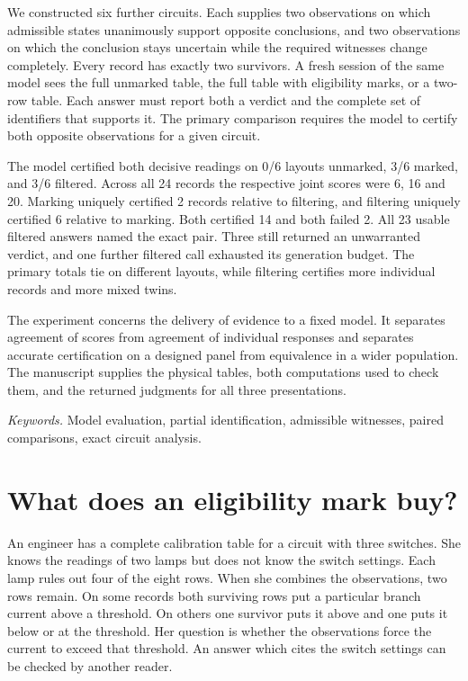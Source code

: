 \documentclass[12pt,letterpaper]{article}
\begin{document}
We constructed six further circuits. Each supplies two observations on which admissible states unanimously support opposite conclusions, and two observations on which the conclusion stays uncertain while the required witnesses change completely. Every record has exactly two survivors. A fresh session of the same model sees the full unmarked table, the full table with eligibility marks, or a two-row table. Each answer must report both a verdict and the complete set of identifiers that supports it. The primary comparison requires the model to certify both opposite observations for a given circuit.
 
The model certified both decisive readings on 0/6 layouts unmarked, 3/6 marked, and 3/6 filtered. Across all 24 records the respective joint scores were 6, 16 and 20. Marking uniquely certified 2 records relative to filtering, and filtering uniquely certified 6 relative to marking. Both certified 14 and both failed 2. All 23 usable filtered answers named the exact pair. Three still returned an unwarranted verdict, and one further filtered call exhausted its generation budget. The primary totals tie on different layouts, while filtering certifies more individual records and more mixed twins.

The experiment concerns the delivery of evidence to a fixed model. It separates agreement of scores from agreement of individual responses and separates accurate certification on a designed panel from equivalence in a wider population. The manuscript supplies the physical tables, both computations used to check them, and the returned judgments for all three presentations.

\vfill\small\textit{Keywords.} Model evaluation, partial identification, admissible witnesses, paired comparisons, exact circuit analysis.
\clearpage\tableofcontents\clearpage{}


\section{What does an eligibility mark buy?}

An engineer has a complete calibration table for a circuit with three switches. She knows the readings of two lamps but does not know the switch settings. Each lamp rules out four of the eight rows. When she combines the observations, two rows remain. On some records both surviving rows put a particular branch current above a threshold. On others one survivor puts it above and one puts it below or at the threshold. Her question is whether the observations force the current to exceed that threshold. An answer which cites the switch settings can be checked by another reader.
\end{document}
